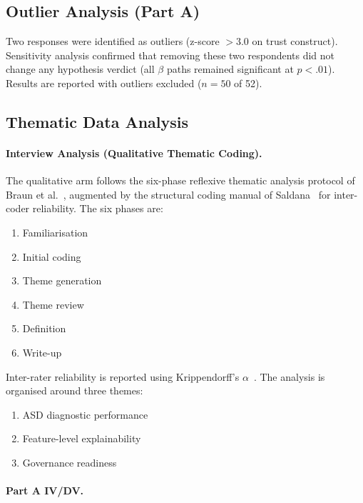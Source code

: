 \subsection{Outlier Analysis (Part A)}

Two responses were identified as outliers (z-score $> 3.0$ on trust construct). Sensitivity analysis confirmed that removing these two respondents did not change any hypothesis verdict (all $\beta$ paths remained significant at $p < .01$). Results are reported with outliers excluded ($n = 50$ of 52).

\subsection{Thematic Data Analysis}
\paragraph{Interview Analysis (Qualitative Thematic Coding).}

The qualitative arm follows the six-phase reflexive thematic analysis protocol of Braun et al.~\cite{braun2006thematic}, augmented by the structural coding manual of Saldana~\cite{saldana2021coding} for inter-coder reliability. The six phases are:
\begin{enumerate}[leftmargin=*, itemsep=1pt, label=\arabic*.]
    \item Familiarisation
    \item Initial coding
    \item Theme generation
    \item Theme review
    \item Definition
    \item Write-up
\end{enumerate}
\noindent Inter-rater reliability is reported using Krippendorff's $\alpha$~\cite{krippendorff2011computing}. The analysis is organised around three themes:
\begin{enumerate}[leftmargin=*, itemsep=1pt, label=(\arabic*)]
    \item ASD diagnostic performance
    \item Feature-level explainability
    \item Governance readiness
\end{enumerate}

\paragraph{Part A IV/DV.}

